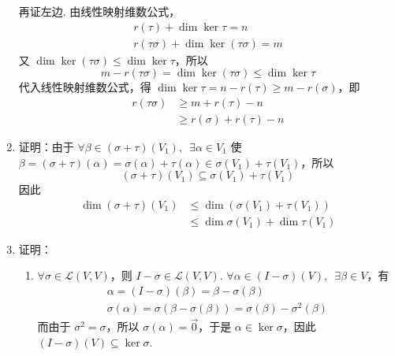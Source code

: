 \begin{enumerate}
          再证左边. 由线性映射维数公式，
          \begin{gather*}
              r(\tau) + \dim \ker \tau = n \\
              r(\tau \sigma) + \dim \ker(\tau \sigma) = m
          \end{gather*}
          又 $ \dim \ker(\tau \sigma) \leqslant \dim \ker \tau $，所以
          \[ m - r(\tau \sigma) = \dim \ker(\tau \sigma) \leqslant \dim \ker \tau \]
          代入线性映射维数公式，得 $ \dim \ker \tau = n - r(\tau) \geqslant m - r(\sigma) $，即
          \begin{align*}
              r(\tau \sigma) & \geqslant m + r(\tau) - n         \\
                             & \geqslant r(\sigma) + r(\tau) - n
          \end{align*}

    \item 证明：由于 $ \forall \beta \in (\sigma + \tau)(V_1),\enspace \exists \alpha \in V_1 $ 使 $ \beta = (\sigma + \tau)(\alpha) = \sigma(\alpha) + \tau(\alpha) \in \sigma(V_1) + \tau(V_1) $，所以
          \[ (\sigma + \tau)(V_1) \subseteq \sigma(V_1) + \tau(V_1) \]
          因此
          \begin{align*}
              \dim(\sigma + \tau)(V_1) & \leqslant \dim(\sigma(V_1) + \tau(V_1))     \\
                                       & \leqslant \dim \sigma(V_1) + \dim \tau(V_1)
          \end{align*}

    \item 证明：\begin{enumerate}
              \item \label{item:6:C:4:1}
                    $ \forall \sigma \in \mathcal{L}(V, V) $，则 $ I - \sigma \in \mathcal{L}(V, V) $. $ \forall \alpha \in (I - \sigma)(V),\enspace \exists \beta \in V $，有
                    \begin{gather*}
                        \alpha = (I - \sigma)(\beta) = \beta - \sigma(\beta) \\
                        \sigma(\alpha) = \sigma(\beta - \sigma(\beta)) = \sigma(\beta) - \sigma^2(\beta)
                    \end{gather*}
                    而由于 $ \sigma^2 = \sigma $，所以 $ \sigma(\alpha) = \vec{0} $，于是 $ \alpha \in \ker \sigma $，因此 $ (I - \sigma)(V) \subseteq \ker \sigma $.


\end{enumerate}
\end{enumerate}

